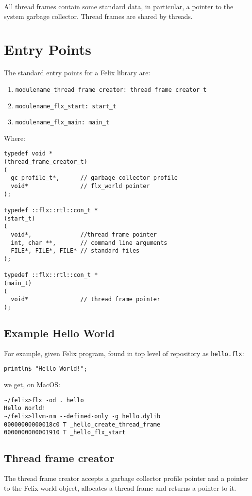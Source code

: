 \documentclass[oneside]{book}
\begin{document}
All thread frames contain some standard data, in particular, a pointer
to the system garbage collector. Thread frames are shared by threads.
\section{Entry Points}
The standard entry points for a Felix library are:

\begin{enumerate}
\item \verb$modulename_thread_frame_creator: thread_frame_creator_t$
\item \verb$modulename_flx_start: start_t$
\item \verb$modulename_flx_main: main_t$
\end{enumerate}

Where:

\begin{verbatim}
typedef void *
(thread_frame_creator_t)
(
  gc_profile_t*,      // garbage collector profile
  void*               // flx_world pointer
);

typedef ::flx::rtl::con_t *
(start_t)
(
  void*,              //thread frame pointer 
  int, char **,       // command line arguments
  FILE*, FILE*, FILE* // standard files 
);

typedef ::flx::rtl::con_t *
(main_t)
(
  void*               // thread frame pointer
);
\end{verbatim}

\subsection{Example Hello World}
For example, given Felix program, found in top level of repository as \verb$hello.flx$:
\begin{verbatim}
println$ "Hello World!";
\end{verbatim}

we get, on MacOS:

\begin{verbatim}
~/felix>flx -od . hello
Hello World!
~/felix>llvm-nm --defined-only -g hello.dylib
00000000000018c0 T _hello_create_thread_frame
0000000000001910 T _hello_flx_start
\end{verbatim}

\subsection{Thread frame creator}
The thread frame creator accepts a garbage collector profile
pointer and a pointer to the Felix world object, allocates
a thread frame and returns a pointer to it.
\end{document}

